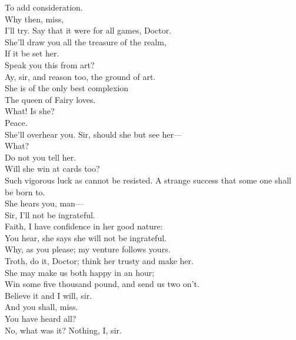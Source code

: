 \documentclass[a4paper,oneside,12pt]{memoir}
\begin{document}
\begin{drama*}
To add consideration.\\
\facespeaks {} Why then, miss,\\
I'll try. Say that it were for all games, Doctor.\\
\subtlespeaks She'll draw you all the treasure of the realm,\\
If it be set her.\\
\facespeaks {} Speak you this from art?\\
\subtlespeaks Ay, sir, and reason too, the ground of art.\\
She is of the only best complexion\\
The queen of Fairy loves.\\
\facespeaks {} What! Is she?\\
\subtlespeaks {} Peace.\\
She'll overhear you. Sir, should she but see her---\\
\facespeaks What?\\
\subtlespeaks {} Do not you tell her.\\
\facespeaks {} Will she win at cards too?\\
\subtlespeaks Such vigorous luck as cannot be resisted.
\facespeaks A strange success that some one shall be born to.\\
\subtlespeaks She hears you, man---\\
\dapperspeaks {} Sir, I'll not be ingrateful.\\
\facespeaks Faith, I have confidence in her good nature:\\
You hear, she says she will not be ingrateful.\\
\subtlespeaks Why, as you please; my venture follows yours.\\
\facespeaks Troth, do it, Doctor; think her trusty and make her.\\
She may make us both happy in an hour;\\
Win some five thousand pound, and send us two on't.\\
\dapperspeaks Believe it and I will, sir.\\
\facespeaks {} And you shall, miss.\\
You have heard all?\\
\dapperspeaks {} No, what was it? Nothing, I, sir.\\

\end{drama*}
\end{document}
